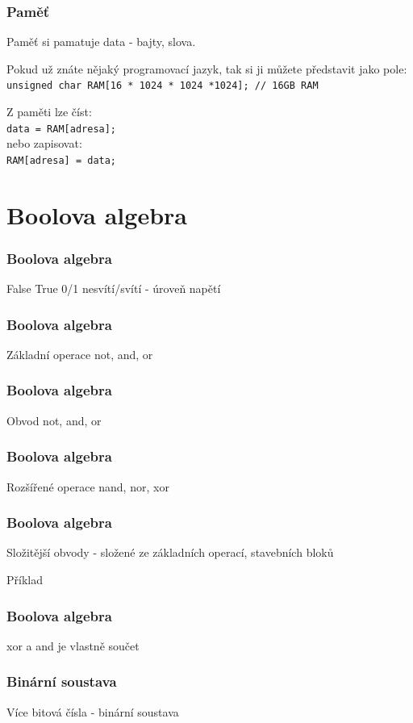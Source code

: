 \documentclass{beamer}
\begin{document}
\begin{frame}
\frametitle{Paměť}

Paměť si pamatuje data - bajty, slova.

Pokud už znáte nějaký programovací jazyk, tak si ji můžete představit jako pole:\\
\texttt{unsigned char RAM[16 * 1024 * 1024 *1024]; // 16GB RAM}

\bigskip
Z paměti lze číst:\\
\texttt{data = RAM[adresa];}\\
nebo zapisovat:\\
\texttt{RAM[adresa] = data;}

\end{frame}

\section{Boolova algebra}
\begin{frame}
\frametitle{Boolova algebra}

False True 0/1 nesvítí/svítí - úroveň napětí
\end{frame}

\begin{frame}
\frametitle{Boolova algebra}

Základní operace not, and, or
\end{frame}

\begin{frame}
\frametitle{Boolova algebra}

Obvod not, and, or
\end{frame}

\begin{frame}
\frametitle{Boolova algebra}

Rozšířené operace nand, nor, xor
\end{frame}

\begin{frame}
\frametitle{Boolova algebra}

Složitější obvody - složené ze základních operací, stavebních bloků

Příklad
\end{frame}

\begin{frame}
\frametitle{Boolova algebra}

xor a and je vlastně součet
\end{frame}

\begin{frame}
\frametitle{Binární soustava}

Více bitová čísla - binární soustava
\end{frame}
\end{document}
